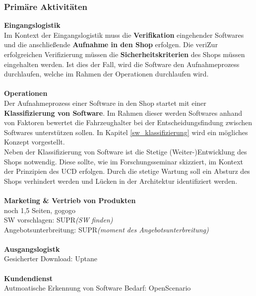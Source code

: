 \subsubsection{Primäre Aktivitäten}
\textbf{Eingangslogistik}\\
Im Kontext der Eingangslogistik muss die \textbf{Verifikation} eingehender Softwares und die anschließende \textbf{Aufnahme in den Shop }erfolgen. Die veriZur erfolgreichen Verifizierung müssen die \textbf{Sicherheitskriterien} des Shops müssen eingehalten werden. Ist dies der Fall, wird die Software den Aufnahmeprozess durchlaufen, welche im Rahmen der Operationen durchlaufen wird.\\\\
\textbf{Operationen}\\
Der Aufnahmeprozess einer Software in den Shop startet mit einer \textbf{Klassifizierung von Software}. Im Rahmen dieser werden Softwares anhand von Faktoren bewertet die Fahrzeughalter bei der Entscheidungsfindung zwischen Softwares unterstützen sollen. In Kapitel \ref{sw_klassifizierung} wird ein mögliches Konzept vorgestellt.\\
Neben der Klassifizierung von Software ist die Stetige (Weiter-)Entwicklung  des Shops notwendig. Diese sollte, wie im Forschungsseminar skizziert, im Kontext der Prinzipien des UCD erfolgen. Durch die stetige Wartung soll ein Absturz des Shops verhindert werden und Lücken in der Architektur identifiziert werden. 
\\\\
\textbf{Marketing \& Vertrieb von Produkten}\\
noch 1,5 Seiten, gogogo\\
SW vorschlagen: SUPR\textit{(SW finden)}\\
Angebotsunterbreitung: SUPR\textit{(moment des Angebotsunterbreitung)}\\\\
\textbf{Ausgangslogistk}\\
Gesicherter Download: Uptane\\\\
\textbf{Kundendienst}\\
Autmoatische Erkennung von Software Bedarf: OpenScenario\\

